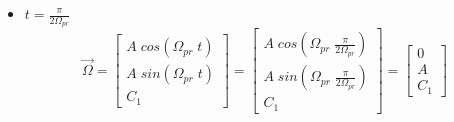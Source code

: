 \documentclass[oneside,a4paper,english,links]{amca}
\begin{document}
\begin{itemize}
    \item \underline{$t=\frac{\pi}{2\Omega_{pr}}$}\\
\begin{equation}
    \vec{\Omega}=
\begin{bmatrix}
A \;cos\left(\Omega_{pr}\;t\right)\\
A \;sin\left(\Omega_{pr}\;t\right)\\
C_1
\end{bmatrix}=
\begin{bmatrix}
A \;cos\left(\Omega_{pr}\;\frac{\pi}{2\Omega_{pr}}\right)\\
A \;sin\left(\Omega_{pr}\;\frac{\pi}{2\Omega_{pr}}\right)\\
C_1
\end{bmatrix}=
\begin{bmatrix}
0 \\
A \\
C_1
\end{bmatrix}
\label{eq:omega_tpi/2omega}
\end{equation}
\end{itemize}
\end{document}
